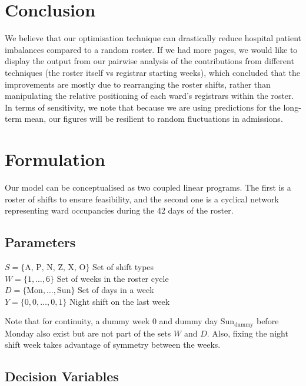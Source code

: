 \documentclass[a4paper]{article}
\begin{document}
\section{Conclusion}

We believe that our optimisation technique can drastically reduce hospital patient imbalances compared to a random roster. If we had more pages, we would like to display the output from our pairwise analysis of the contributions from different techniques (the roster itself vs registrar starting weeks), which concluded that the improvements are mostly due to rearranging the roster shifts, rather than manipulating the relative positioning of each ward's registrars within the roster. In terms of sensitivity, we note that because we are using predictions for the long-term mean, our figures will be resilient to random fluctuations in admissions.

\newpage
\appendix
\section{Formulation}

Our model can be conceptualised as two coupled linear programs. The first is a roster of shifts to ensure feasibility, and the second one is a cyclical network representing ward occupancies during the 42 days of the roster.

\subsection{Parameters}
\begin{multicols}{2}
\noindent


$S = \{\text{A, P, N, Z, X, O}\}$ \dotfill Set of shift types\\
$W = \{1, \dots, 6\}$ \dotfill Set of weeks in the roster cycle\\
$D = \{\text{Mon},\dots,\text{Sun}\}$ \dotfill Set of days in a week\\
$Y  = \{0, 0,\dots, 0, 1\}$ \dotfill Night shift on the last week

Note that for continuity, a dummy week $0$ and dummy day $\text{Sun}_\text{dummy}$ before Monday also exist but are not part of the sets $W$ and $D$. Also, fixing the night shift week takes advantage of symmetry between the weeks.
\end{multicols}
\subsection{Decision Variables}
\end{document}
